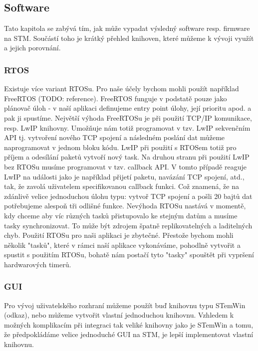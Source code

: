 \subsection{Software}
Tato kapitola se zabývá tím, jak může vypadat výsledný software resp. firmware na STM.
Součástí toho je krátký přehled knihoven, které můžeme k vývoji využít a jejich porovnání.

\subsubsection{RTOS}
Existuje více variant RTOSu.
Pro naše účely bychom mohli použít například FreeRTOS (TODO: reference).
FreeRTOS funguje v podstatě pouze jako plánovač úloh - v naší aplikaci definujeme entry point
úlohy, její prioritu apod. a pak ji spustíme.
Největší výhoda FreeRTOSu je při použití TCP/IP komunikace, resp. LwIP knihovny.
Umožňuje nám totiž programovat v tzv. LwIP sekvenčním API tj. vytvoření nového TCP spojení
a následném poslání dat můžeme naprogramovat v jednom bloku kódu.
LwIP při použití s RTOSem totiž pro příjem a odesílání paketů vytvoří nový task.
Na druhou stranu při použití LwIP bez RTOSu musíme programovat v tzv. callback API.
V tomto případě reaguje LwIP na události jako je například přijetí paketu, navázání TCP spojení, atd.,
tak, že zavolá uživatelem specifikovanou callback funkci.
Což znamená, že na zdánlivě velice jednoduchou úlohu typu: vytvoř TCP spojení a pošli 20 bajtů dat
potřebujeme alespoň tři odlišné funkce.
Nevýhoda RTOSu nastává v momentě, kdy chceme aby víc různých tasků přistupovalo ke stejným datům
a musíme tasky synchronizovat.
To může být zdrojem špatně replikovatelných a laditelných chyb.
Použití RTOSu pro naši aplikaci je zbytečné.
Přestože bychom mohli několik "tasků", které v rámci naší aplikace vykonáváme, pohodlně vytvořit
a spustit s použitím RTOSu, bohatě nám postačí tyto "tasky" spouštět při vypršení hardwarových
timerů.


\subsubsection{GUI}
Pro vývoj uživatelského rozhraní můžeme použít buď knihovnu typu STemWin (odkaz), nebo můžeme
vytvořit vlastní jednoduchou knihovnu.
Vzhledem k možných komplikacím při integraci tak veliké knihovny jako je STemWin a tomu, že
předpokládáme velice jednoduché GUI na STM, je lepší implementovat vlastní knihovnu.
